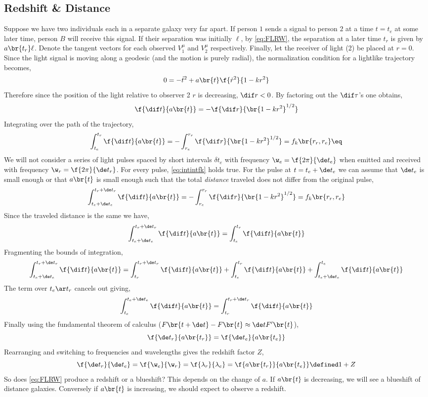 \documentclass{article}
\begin{document}
\subsection{Redshift \& Distance}
Suppose we have two individuals each in a separate galaxy very far apart. If person $1$ sends a signal to person $2$ at a time $t = t_e$ at some later time, person $B$ will receive this signal. If their separation was initially $\ell$, by \eqref{eq:FLRW}, the separation at a later time $t_r$ is given by $a\br{t_r} \ell$. Denote the tangent vectors for each observed $V^\mu_1$ and $V^\mu_2$ respectively. Finally, let the receiver of light (2) be placed at $r=0$. Since the light signal is moving along a geodesic (and the motion is purely radial), the normalization condition for a lightlike trajectory becomes,
\[ 0 = - \dot{t}^2 + a\br{t} \f{\dot{r}^2}{1 - kr^2} \]
Therefore since the position of the light relative to observer 2 $r$ is decreasing, $\dif r < 0$. By factoring out the $\dif \tau$'s one obtains,
\[ \f{\dif t}{a\br{t}} = - \f{\dif r}{\br{1-kr^2}^{1/2}} \]
Integrating over the path of the trajectory,
\[ \int_{t_e}^{t_r} \f{\dif t}{a\br{t}} = - \int_{r_e}^{r_r} \f{\dif r}{\br{1-kr^2}^{1/2}} = f_k \br{r_r, r_e} \eq \label{eq:intintfk}\]
We will not consider a series of light pulses spaced by short intervals $\delta t_e$ with frequency $\w_e = \f{2 \pi }{\de t_e}$ when emitted and received with frequency $\w_r = \f{2 \pi }{\de t_r}$. For every pulse, \eqref{eq:intintfk} holds true. For the pulse at $t = t_e + \de t_e$ we can assume that $\de t_e$ is small enough or that $a\br{t}$ is small enough such that the total \textit{distance} traveled does not differ from the original pulse,
\[ \int_{t_e + \de t_e}^{t_r + \de t_r} \f{\dif t}{a\br{t}} = - \int_{r_e}^{r_r} \f{\dif r}{\br{1-kr^2}^{1/2}} = f_k \br{r_r, r_e} \]
Since the traveled distance is the same we have,
\[ \int_{t_e + \de t_e}^{t_r + \de t_r} \f{\dif t}{a\br{t}} = \int_{t_e}^{t_r} \f{\dif t}{a\br{t}} \]
Fragmenting the bounds of integration,
\[ \int_{t_e + \de t_e}^{t_r + \de t_r} \f{\dif t}{a\br{t}} = \int_{t_r}^{t_r + \de t_r} \f{\dif t}{a\br{t}} + \int_{t_e}^{t_r} \f{\dif t}{a\br{t}} + \int_{t_e + \de t_e}^{t_e} \f{\dif t}{a\br{t}} \]
The term over $t_e \ar t_r$ cancels out giving,
\[ \int_{t_e}^{t_e + \de t_e} \f{\dif t}{a\br{t}} = \int_{t_r }^{t_r + \de t_r} \f{\dif t}{a\br{t}} \]
Finally using the fundamental theorem of calculus ($F\br{t + \de t} - F\br{t} \approx \de t F'\br{t}$),
\[ \f{\de t_r}{a\br{t_r}} = \f{\de t_e}{a\br{t_e}} \]
Rearranging and switching to frequencies and wavelengths gives the redshift factor $Z$,
\[ \f{\de t_r}{\de t_e} = \f{\w_e}{\w_r} = \f{\lambda_r}{\lambda_e} = \f{a\br{t_r}}{a\br{t_e}} \defined 1 + Z \]
So does \eqref{eq:FLRW} produce a redshift or a blueshift? This depends on the change of $a$. If $a\br{t}$ is decreasing, we will see a blueshift of distance galaxies. Conversely if $a\br{t}$ is increasing, we should expect to observe a redshift. \\
\end{document}

